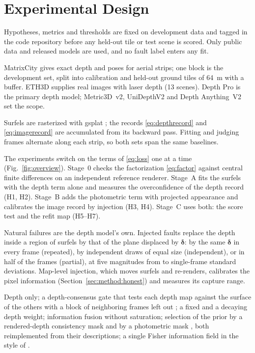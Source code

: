 \section{Experimental Design}
\label{sec:setup}
Hypotheses, metrics and thresholds are fixed on development data and tagged in the code repository before
any held-out tile or test scene is scored. Only public data and released models are used, and no fault
label enters any fit.

 MatrixCity \cite{data_matrixcity} gives exact depth and poses for aerial strips; one block is
the development set, split into calibration and held-out ground tiles of 64~m with a buffer.
ETH3D \cite{data_eth3d} supplies real images with laser depth (13 scenes). Depth Pro \cite{est_depthpro} is
the primary depth model; Metric3D~v2, UniDepthV2 and Depth Anything~V2
\cite{est_metric3dv2,est_unidepth,est_dav2} set the scope.

 Surfels are rasterized with gsplat \cite{gs_gsplat}; the records
\eqref{eq:depthrecord} and \eqref{eq:imagerecord} are accumulated from its backward pass. Fitting and judging frames alternate along each strip, so both sets span the
same baselines. 

 The experiments switch on the terms of \eqref{eq:loss} one at a time
(Fig.~\ref{fig:overview}). Stage~0 checks the factorization \eqref{eq:factor} against central finite
differences on an independent reference renderer. Stage~A fits the surfels with the depth term alone and measures the overconfidence of
the depth record (H1, H2). Stage~B adds the photometric term with projected appearance and calibrates the
image record by injection (H3, H4). Stage~C uses both: the score test and the refit map (H5--H7).

 Natural failures are the depth model's own. Injected faults replace the depth inside a
region of  surfels by that of the plane displaced by $\boldsymbol\delta$: by the same
$\boldsymbol\delta$ in every frame (repeated), by independent draws of equal size (independent), or in half
of the frames (partial), at five magnitudes from  to  single-frame standard deviations.
Map-level injection, which moves surfels and re-renders, calibrates the pixel information
(Section~\ref{sec:method:honest}) and measures its capture range.

 Depth only; a depth-consensus gate that tests each depth map against the surface of
the others with a block of neighboring frames left out \cite{stat_teunissen_dia,flt_raim_joerger}; a
fixed and a decaying depth weight; information fusion without saturation; selection of the prior by a
rendered-depth consistency mask \cite{dep_indepthwetrust} and by a photometric mask
\cite{dep_reliability}, both reimplemented from their descriptions; a single Fisher information field in
the style of \cite{unc_fisherrf}.

